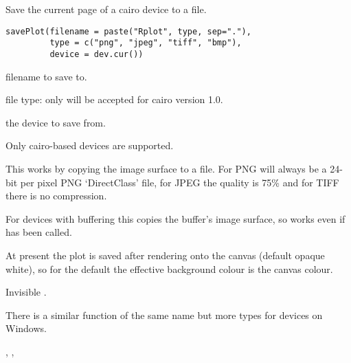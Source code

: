 %
\begin{Description}\relax
Save the current page of a cairo  device to a file. 
\end{Description}
%
\begin{Usage}
\begin{verbatim}
savePlot(filename = paste("Rplot", type, sep="."),
         type = c("png", "jpeg", "tiff", "bmp"),
         device = dev.cur())
\end{verbatim}
\end{Usage}
%
\begin{Arguments}
\begin{ldescription}
\item[\code{filename}] filename to save to.
\item[\code{type}] file type: only  will be accepted for cairo
version 1.0.
\item[\code{device}] the device to save from.
\end{ldescription}
\end{Arguments}
%
\begin{Details}\relax
Only cairo-based  devices are supported.

This works by copying the image surface to a file.  For PNG
will always be a 24-bit per pixel PNG `DirectClass' file, for
JPEG the quality is 75\% and for TIFF there is no compression.

For devices with buffering this copies the buffer's image surface, so
works even if  has been called.

At present the plot is saved after rendering onto the canvas (default
opaque white), so for the default  the
effective background colour is the canvas colour.
\end{Details}
%
\begin{Value}
Invisible .
\end{Value}
%
\begin{Note}\relax
There is a similar function of the same name but more types for
 devices on Windows.
\end{Note}
%
\begin{SeeAlso}\relax
{}, , 
\end{SeeAlso}
